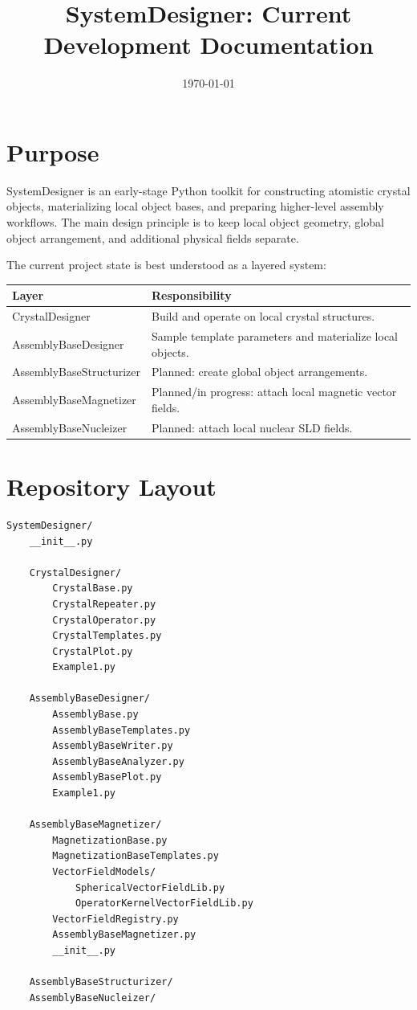 \documentclass[11pt,a4paper]{article}
\title{SystemDesigner: Current Development Documentation}
\author{}
\date{\today}
\begin{document}
\maketitle

\section{Purpose}

SystemDesigner is an early-stage Python toolkit for constructing atomistic
crystal objects, materializing local object bases, and preparing higher-level
assembly workflows. The main design principle is to keep local object geometry,
global object arrangement, and additional physical fields separate.

The current project state is best understood as a layered system:

\begin{center}
\begin{tabular}{ll}
\toprule
Layer & Responsibility \\
\midrule
CrystalDesigner & Build and operate on local crystal structures. \\
AssemblyBaseDesigner & Sample template parameters and materialize local objects. \\
AssemblyBaseStructurizer & Planned: create global object arrangements. \\
AssemblyBaseMagnetizer & Planned/in progress: attach local magnetic vector fields. \\
AssemblyBaseNucleizer & Planned: attach local nuclear SLD fields. \\
\bottomrule
\end{tabular}
\end{center}

\section{Repository Layout}

\begin{lstlisting}
SystemDesigner/
    __init__.py

    CrystalDesigner/
        CrystalBase.py
        CrystalRepeater.py
        CrystalOperator.py
        CrystalTemplates.py
        CrystalPlot.py
        Example1.py

    AssemblyBaseDesigner/
        AssemblyBase.py
        AssemblyBaseTemplates.py
        AssemblyBaseWriter.py
        AssemblyBaseAnalyzer.py
        AssemblyBasePlot.py
        Example1.py

    AssemblyBaseMagnetizer/
        MagnetizationBase.py
        MagnetizationBaseTemplates.py
        VectorFieldModels/
            SphericalVectorFieldLib.py
            OperatorKernelVectorFieldLib.py
        VectorFieldRegistry.py
        AssemblyBaseMagnetizer.py
        __init__.py

    AssemblyBaseStructurizer/
    AssemblyBaseNucleizer/
\end{lstlisting}
\end{document}
